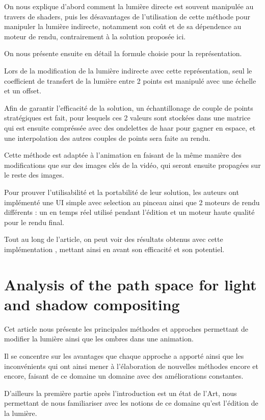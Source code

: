 \documentclass{article}
\begin{document}
On nous explique d'abord comment la lumière directe est souvent manipulée au travers de shaders, puis les désavantages de l'utilisation de cette méthode pour manipuler la lumière indirecte, notamment son coût et de sa dépendence au moteur de rendu, contrairement à la solution proposée ici.

On nous présente ensuite en détail la formule choisie pour la représentation. 

Lors de la modification de la lumière indirecte avec cette représentation, seul le coefficient de transfert de la lumière entre 2 points est manipulé avec une échelle et un offset.  

Afin de garantir l'efficacité de la solution, un échantillonage de couple de points stratégiques est fait, pour lesquels ces 2 valeurs sont stockées dans une matrice qui est ensuite compréssée avec des ondelettes de haar pour gagner en espace, et une interpolation des autres couples de points sera faite au rendu.

Cette méthode est adaptée à l'animation en faisant de la même manière des modifications que sur des images clés de la vidéo, qui seront ensuite propagées sur le reste des images.

Pour prouver l'utilisabilité et la portabilité de leur solution, les auteurs ont implémenté une UI simple avec selection au pinceau ainsi que 2 moteurs de rendu différents : un en temps réel utilisé pendant l'édition et un moteur haute qualité pour le rendu final.

Tout au long de l'article, on peut voir des résultats obtenus avec cette implémentation , mettant ainsi en avant son efficacité et son potentiel.

\newpage
\section{Analysis of the path space for light and shadow compositing}
Cet article nous présente les principales méthodes et approches permettant de modifier la lumière ainsi que les ombres dans une animation.

Il se concentre sur les avantages que chaque approche a apporté ainsi que les inconvénients qui ont ainsi mener à l’élaboration de nouvelles méthodes encore et encore, faisant de ce domaine un domaine avec des améliorations constantes.

D’ailleurs la première partie après l’introduction est un état de l’Art, nous permettant de nous familiariser avec les notions de ce domaine qu’est l’édition de la lumière.
\end{document}
